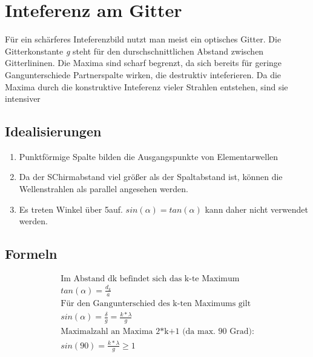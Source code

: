 \documentclass{article}
\begin{document}
\section*{Inteferenz am Gitter}
Für ein schärferes Inteferenzbild nutzt man meist ein optisches Gitter.
Die Gitterkonstante \emph{g} steht für den durschschnittlichen Abstand zwischen Gitterlininen.
Die Maxima sind scharf begrenzt, da sich bereits für geringe Gangunterschiede Partnerspalte wirken, die destruktiv
inteferieren. Da die Maxima durch die konstruktive Inteferenz vieler Strahlen entstehen, sind sie intensiver
\subsection*{Idealisierungen}
\begin{enumerate}
    \item Punktförmige Spalte bilden die Ausgangspunkte von Elementarwellen
    \item Da der SChirmabstand viel größer als der Spaltabstand ist, können die Wellenstrahlen als parallel angesehen werden.
    \item Es treten Winkel über 5\textdegree auf. $sin(\alpha)=tan(\alpha)$ kann daher nicht verwendet werden.
\end{enumerate}
\subsection*{Formeln}
\begin{align*}
    \text{Im Abstand dk befindet sich das k-te Maximum}\\
    tan(\alpha)=\frac{d_k}{a}\\
    \text{Für den Gangunterschied des k-ten Maximums gilt}\\
    sin(\alpha)=\frac{\delta}{g}=\frac{k*\lambda}{g}\\
    \text{Maximalzahl an Maxima 2*k+1 (da max. 90 Grad):}\\
    sin(90)=\frac{k*\lambda}{g} \geq 1\\
\end{align*}
\end{document}
